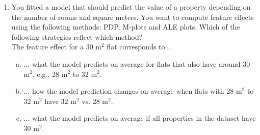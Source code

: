 \begin{enumerate}
    \item
    You fitted a model that should predict the value of a property depending on the number of rooms and square meters.
    You want to compute feature effects using the following methods: PDP, M-plots and ALE plots. 
    Which of the following strategies reflect which method? \\
    The feature effect for a 30 m$^2$ flat corresponds to... 
    \begin{enumerate}[a)]
        \item ... what the model predicts on average for flats that also have around 30 m$^2$, e.g., 28 m$^2$ to 32 m$^2$. 
        \item ... how the model prediction changes on average when flats with 28 m$^2$ to 32 m$^2$ have 32 m$^2$ vs. 28 m$^2$. 
        \item ... what the model predicts on average if all properties in the dataset have 30 m$^2$. 
\end{enumerate}

\end{enumerate}